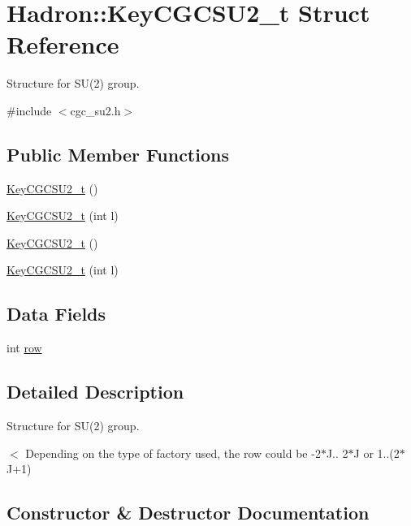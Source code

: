 \hypertarget{structHadron_1_1KeyCGCSU2__t}{}\section{Hadron\+:\+:Key\+C\+G\+C\+S\+U2\+\_\+t Struct Reference}
\label{structHadron_1_1KeyCGCSU2__t}


Structure for S\+U(2) group.  




{\ttfamily \#include $<$cgc\+\_\+su2.\+h$>$}

\subsection*{Public Member Functions}
\begin{DoxyCompactItemize}
\item 
\mbox{\hyperlink{structHadron_1_1KeyCGCSU2__t_ad694c4b6fba602e16f67dc25f4d1b480}{Key\+C\+G\+C\+S\+U2\+\_\+t}} ()
\item 
\mbox{\hyperlink{structHadron_1_1KeyCGCSU2__t_abe46c2e3bffc2fd9818d7da7c91983cc}{Key\+C\+G\+C\+S\+U2\+\_\+t}} (int l)
\item 
\mbox{\hyperlink{structHadron_1_1KeyCGCSU2__t_ad694c4b6fba602e16f67dc25f4d1b480}{Key\+C\+G\+C\+S\+U2\+\_\+t}} ()
\item 
\mbox{\hyperlink{structHadron_1_1KeyCGCSU2__t_abe46c2e3bffc2fd9818d7da7c91983cc}{Key\+C\+G\+C\+S\+U2\+\_\+t}} (int l)
\end{DoxyCompactItemize}
\subsection*{Data Fields}
\begin{DoxyCompactItemize}
\item 
int \mbox{\hyperlink{structHadron_1_1KeyCGCSU2__t_a96e0da2b64dff83f72b594bc4fef5c75}{row}}
\end{DoxyCompactItemize}


\subsection{Detailed Description}
Structure for S\+U(2) group. 

$<$ Depending on the type of factory used, the row could be -\/2$\ast$J.. 2$\ast$J or 1..(2$\ast$\+J+1) 

\subsection{Constructor \& Destructor Documentation}
\mbox{\label{structHadron_1_1KeyCGCSU2__t_ad694c4b6fba602e16f67dc25f4d1b480}} 
